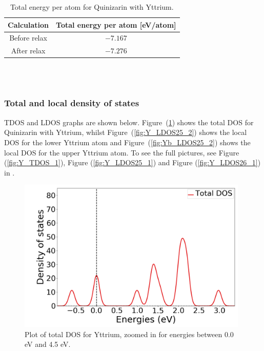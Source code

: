 \documentclass{article}
\begin{document}
      \begin{table}[H]
        \centering
        \caption{Total energy per atom for Quinizarin with Yttrium. }
        \vspace{0mm}
        \label{tab:TOTENY}
        \begin{tabular}{|c|c|}
            \hline
            Calculation & Total energy per atom [eV/atom]  \\
            \hline \hline
            Before relax & $-7.167$ \\
            After relax & $-7.276$ \\
            \hline
        \end{tabular} \\
        \hspace{0pt}\\
      \end{table}

      \vspace{1cm}

    \subsubsection{Total and local density of states}

      TDOS and LDOS graphs are shown below. Figure~(\ref{fig:Y_TDOS_2}) shows the total DOS for Quinizarin with Yttrium, whilst Figure~(\ref{fig:Y_LDOS25_2}) shows the local DOS for the lower Yttrium atom and Figure~(\ref{fig:Yb_LDOS25_2}) shows the local DOS for the upper Yttrium atom. To see the full pictures, see Figure (\ref{fig:Y_TDOS_1}), Figure (\ref{fig:Y_LDOS25_1}) and Figure (\ref{fig:Y_LDOS26_1}) in . \\

      \begin{figure}[H]
        \centering
        \includegraphics[width = 11cm]{../fig/Y_TDOS_2.png}
        \caption{Plot of total DOS for Yttrium, zoomed in for energies between 0.0 eV and 4.5 eV. }
        \label{fig:Y_TDOS_2}
      \end{figure}
\end{document}
